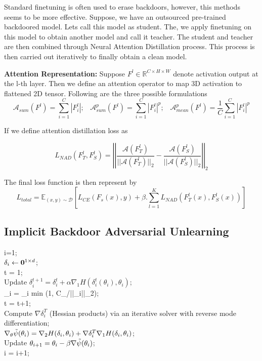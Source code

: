 \documentclass[11pt]{report}
\begin{document}
Standard finetuning is often used to  erase backdoors, however, this methods seems to be more effective. Suppose, we have an outsourced pre-trained backdoored model. Lets call this model as student. The, we apply finetuning on this model to obtain another model and call it teacher. The student and teacher are then combined through Neural Attention Distillation process\cite{li2021neural}. This process is then carried out iteratively to finally obtain a clean model.

\textbf{Attention Representation: }Suppose \(F^l \in \mathbb{R}^{C\times H\times W}\) denote activation output at the l-th layer. Then we define an attention operator to map 3D activation to flattened 2D tensor. Following are the three possible formulations
\[\mathcal{A}_{sum}(F^l)=\sum_{i=1}^C |F^l_i|; \;\;\;\mathcal{A}^p_{sum}(F^l)=\sum_{i=1}^C |F^l_i|^p; \;\;\; \mathcal{A}^p_{mean}(F^l)=\frac{1}{C}\sum_{i=1}^C |F^l_i|^p\]

\noindent If we define attention distillation loss as

\[L_{NAD}(F_T^l, F_S^l) = \left\lvert\left\lvert\frac{\mathcal{A}(F_T^l)}{||\mathcal{A}(F_T^l)||_2} - \frac{\mathcal{A}(F_S^l)}{||\mathcal{A}(F_S^l)||_2}\right\rvert\right\rvert_2\]

\noindent The final loss function is then represent by
\[L_{total} = \mathbb{E}_{(x,y)\sim \mathcal{D}}[L_{CE}(F_s(x),y)+\beta . \sum_{l=1}^{K} L_{NAD}(F_T^l(x), F_S^l(x))]\]

\subsection{Implicit Backdoor Adversarial Unlearning}

\begin{algorithm2e}[!ht]
\DontPrintSemicolon
{}
i=1;\\
    {
    \(\delta_i \leftarrow \bold{0}^{1\times d}\); \\
     t = 1;\\
     {
     Update \(\delta_i^{t+1} = \delta_i^{t}+\alpha \nabla_1 H(\delta_i^t(\theta_i), \theta_i)\);\\
     \delta_i = \delta_i \times min (1, C_{\delta}/||\delta_i||_2);\\
     t = t+1; \\
     }
    Compute \(\nabla{\delta_i^T}\) (Hessian products) via an iterative solver with reverse mode differentiation;\\
    \(\nabla_{\theta} \Tilde{\psi}(\theta_i) = \nabla_2 H(\delta_i, \theta_i)+\nabla \delta_i^T \nabla_1 H(\delta_i, \theta_i) \);\\
    Update \(\theta_{i+1} = \theta_i-\beta \nabla \Tilde{\psi}(\theta_i)\);\\
    i = i+1;\\
    }
\caption{I-BAU}
\label{alg:some_algo}
\end{algorithm2e}
\end{document}
